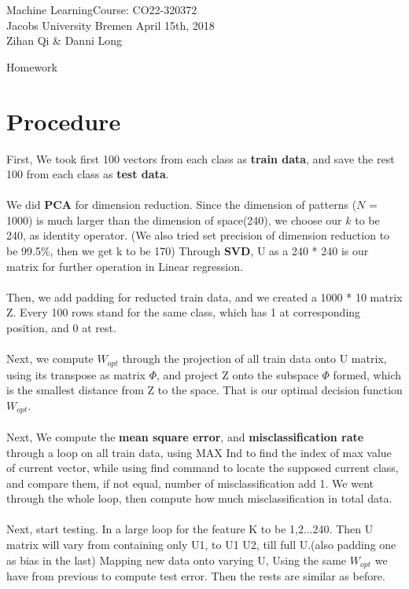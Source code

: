 \documentclass[a4paper]{article}
\newcommand{\coursename}{Machine Learning}
\newcommand{\courseno}{CO22-320372}
\newcommand{\sheettitle}{Homework}
\newcommand{\mytoday}{{April 15th}, 2018}
\newcounter{assignmentno}
\newcommand{\assignment}{\arabic{assignmentno}}
\begin{document}
\coursename \hfill Course: \courseno\\
Jacobs University Bremen \hfill \mytoday\\
{Zihan Qi \& Danni Long}\hfill
\vspace*{0.3cm}\\
\begin{center}
{\Large \sheettitle{} {\assignment}\\}
\end{center}

\section*{Procedure}
First, We took first 100 vectors from each class as \textbf{train data}, and save the rest 100 from each class as \textbf{test data}.\\\\
 We did \textbf{PCA} for dimension reduction. Since the dimension of patterns ($N$ = 1000) is much larger than the dimension of space(240), we choose our $k$ to be 240, as identity operator. (We also tried set precision of dimension reduction to be 99.5\%, then we get k to be 170) Through \textbf{SVD}, U as a 240 * 240 is our matrix for further operation in Linear regression.\\\\
 Then, we add padding for reducted train data, and we created a 1000 * 10 matrix Z. Every 100 rows stand for the same class, which has 1 at corresponding position, and 0 at rest.\\\\
 Next, we compute \textbf{$W_{opt}$} through the projection of all train data onto U matrix, using its transpose as matrix \textbf{$\Phi$}, and project Z onto the subspace $\Phi$ formed, which is the smallest distance from Z to the space. That is our optimal decision function $W_{opt}$.\\\\
 Next, We compute the \textbf{mean square error}, and \textbf{misclassification rate} through a loop on all train data, using MAX Ind to find the index of max value of current vector, while using find command to locate the supposed current class, and compare them, if not equal, number of misclassification add 1. We went through the whole loop, then compute how much misclassification in total data.\\\\
 Next, start testing. In a large loop for the feature K to be 1,2...240. Then U matrix will vary from containing only U1, to U1 U2, till full U.(also padding one as bias in the last) Mapping new data onto varying U, Using the same $W_{opt}$ we have from previous to compute test error. Then the rests are similar as before.\\
\newpage
\end{document}
